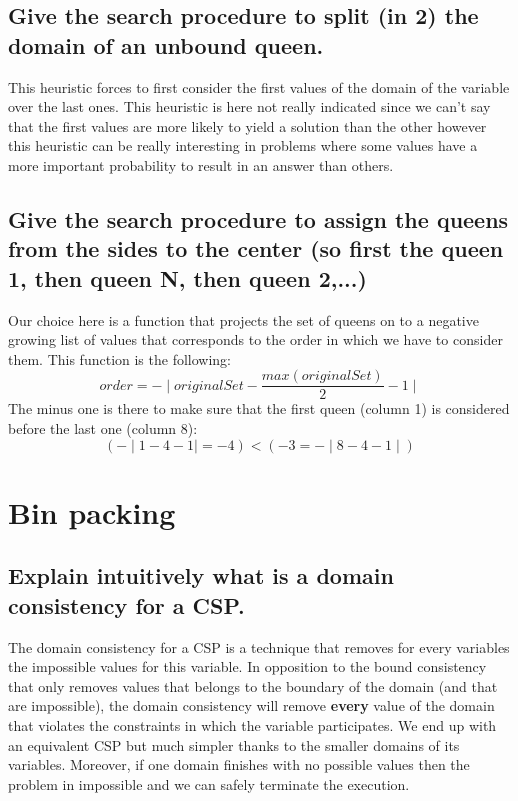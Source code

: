 \documentclass[a4paper ,12pt,french]{article}
\begin{document}
\subsection{Give the search procedure to split (in 2) the domain of an unbound queen.}
This heuristic forces to first consider the first values of the domain of the variable over the last ones. This heuristic is here not really indicated since we can't say that the first values are more likely to yield a solution than the other however this heuristic can be really interesting in problems where some values have a more important probability to result in an answer than others.
\subsection{Give the search procedure to assign the queens from the sides to the center (so first
the queen 1, then queen N, then queen 2,...)}
Our choice here is a function that projects the set of queens on to a negative growing list of values that corresponds to the order in which we have to consider them. This function is the following:
\begin{equation}
order = - \mid originalSet - \frac{max(originalSet)}{2} - 1 \mid
\end{equation}
The minus one is there to make sure that the first queen (column 1) is considered before the last one (column 8):
\begin{equation}
(-\mid 1-4-1\mid = -4) < (-3 = - \mid 8-4-1 \mid)
\end{equation}

\section{Bin packing}
\subsection{Explain intuitively what is a domain consistency for a CSP.}
The domain consistency for a CSP is a technique that removes for every variables the impossible values for this variable. In opposition to the bound consistency that only removes values that belongs to the boundary of the domain (and that are impossible), the domain consistency will remove \textbf{every} value of the domain that violates the constraints in which the variable participates. We end up with an equivalent CSP but much simpler thanks to the smaller domains of its variables. Moreover, if one domain finishes with no possible values then the problem in impossible and we can safely terminate the execution.  
\end{document}
